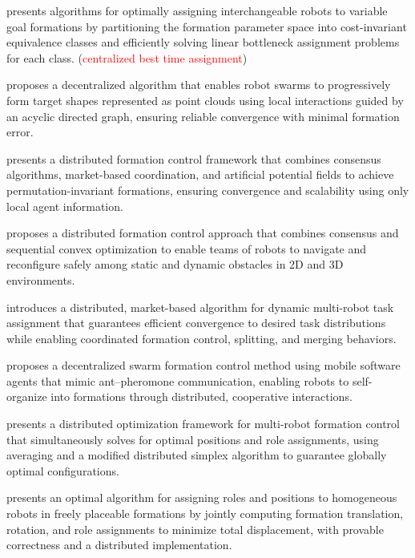 \cite{akella2020assignment} presents algorithms for optimally assigning interchangeable robots to variable goal formations by partitioning the formation parameter space into cost-invariant equivalence classes and efficiently solving linear bottleneck assignment problems for each class. (\textcolor{red}{centralized best time assignment})

\cite{li2019decentralized} proposes a decentralized algorithm that enables robot swarms to progressively form target shapes represented as point clouds using local interactions guided by an acyclic directed graph, ensuring reliable convergence with minimal formation error.

\cite{zavlanos2007distributed} presents a distributed formation control framework that combines consensus algorithms, market-based coordination, and artificial potential fields to achieve permutation-invariant formations, ensuring convergence and scalability using only local agent information.

\cite{alonso2016distributed} proposes a distributed formation control approach that combines consensus and sequential convex optimization to enable teams of robots to navigate and reconfigure safely among static and dynamic obstacles in 2D and 3D environments.

\cite{michael2008distributed} introduces a distributed, market-based algorithm for dynamic multi-robot task assignment that guarantees efficient convergence to desired task distributions while enabling coordinated formation control, splitting, and merging behaviors.

\cite{kambayashi2018distributed} proposes a decentralized swarm formation control method using mobile software agents that mimic ant–pheromone communication, enabling robots to self-organize into formations through distributed, cooperative interactions.

\cite{montijano2014efficient} presents a distributed optimization framework for multi-robot formation control that simultaneously solves for optimal positions and role assignments, using averaging and a modified distributed simplex algorithm to guarantee globally optimal configurations.

\cite{mosteo2017optimal} presents an optimal algorithm for assigning roles and positions to homogeneous robots in freely placeable formations by jointly computing formation translation, rotation, and role assignments to minimize total displacement, with provable correctness and a distributed implementation.


